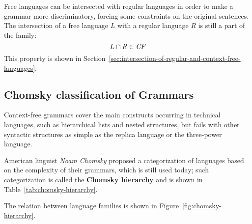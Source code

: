 \documentclass[english]{article}
\begin{document}
\bigskip
Free languages can be intersected with regular languages in order to make a grammar more discriminatory, forcing some constraints on the original sentences.
The intersection of a free language \(L\) with a regular language \(R\) is still a part of the \CF family:
\[ L \cap R \in \textit{CF} \]
This property is shown in Section~\ref{sec:intersection-of-regular-and-context-free-languages}.

\subsection{Chomsky classification of Grammars}

Context-free grammars cover the main constructs occurring in technical languages, such as hierarchical lists and nested structures, but fails with other syntactic structures as simple as the replica language or the three-power language.

American linguist \textit{Noam Chomsky} proposed a categorization of languages based on the complexity of their grammars, which is still used today;
such categorization is called the \textbf{Chomsky hierarchy} and is shown in Table~\ref{tab:chomsky-hierarchy}.

The relation between language families is shown in Figure~\ref{fig:chomsky-hierarchy}.
\end{document}
